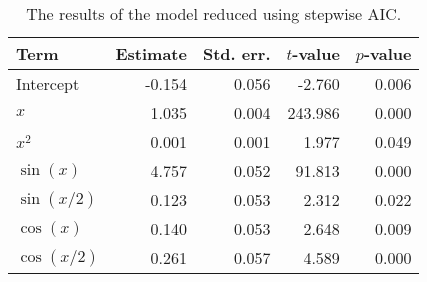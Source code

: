 \begin{table}[!h]

\caption{\label{tab:stepwise-regression}The results of the model reduced using stepwise \ac{AIC}.}
\centering
\begin{tabular}{lrrrr}
\toprule
Term & Estimate & Std. err. & \(t\)-value & \(p\)-value\\
\midrule
Intercept & -0.154 & 0.056 & -2.760 & 0.006\\
\(x\) & 1.035 & 0.004 & 243.986 & 0.000\\
\(x^2\) & 0.001 & 0.001 & 1.977 & 0.049\\
\(\sin(x)\) & 4.757 & 0.052 & 91.813 & 0.000\\
\(\sin(x/2)\) & 0.123 & 0.053 & 2.312 & 0.022\\
\(\cos(x)\) & 0.140 & 0.053 & 2.648 & 0.009\\
\(\cos(x/2)\) & 0.261 & 0.057 & 4.589 & 0.000\\
\bottomrule
\end{tabular}
\end{table}